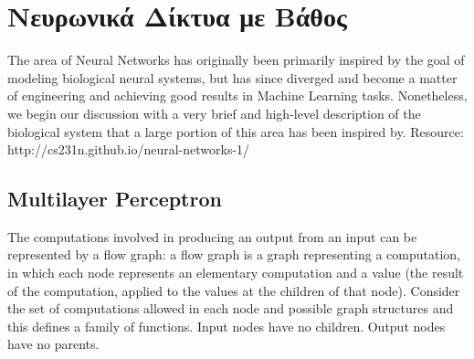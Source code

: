 \section{Νευρωνικά Δίκτυα με Βάθος}
\label{sec:theory_dnn}
The area of Neural Networks has originally been primarily inspired by the goal of modeling biological neural systems, but has since diverged and become a matter of engineering and achieving good results in Machine Learning tasks. Nonetheless, we begin our discussion with a very brief and high-level description of the biological system that a large portion of this area has been inspired by.
Resource: http://cs231n.github.io/neural-networks-1/

\subsection{Multilayer Perceptron}

The computations involved in producing an output from an input can be represented by a flow graph: a flow graph is a graph representing a computation, in which each node represents an elementary computation and a value (the result of the computation, applied to the values at the children of that node). Consider the set of computations allowed in each node and possible graph structures and this defines a family of functions. Input nodes have no children. Output nodes have no parents.
